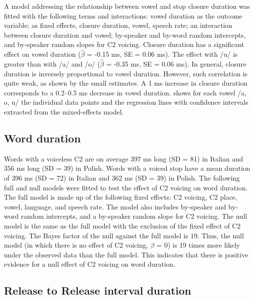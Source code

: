 \documentclass[12pt,]{article}
\begin{document}
A model addressing the relationship between vowel and stop closure
duration was fitted with the following terms and interactions: vowel
duration as the outcome variable; as fixed effects, closure duration,
vowel, speech rate; an interaction between closure duration and vowel;
by-speaker and by-word random intercepts, and by-speaker random slopes
for C2 voicing. Closure duration has a significant effect on vowel
duration (\(\hat{\beta}\) = -0.15 ms, SE = 0.06 ms). The effect with /u/
is greater than with /a/ and /o/ (\(\hat{\beta}\) = -0.35 ms, SE = 0.06
ms). In general, closure duration is inversely proportional to vowel
duration. However, such correlation is quite weak, as shown by the small
estimates. A 1 ms increase in closure duration corresponds to a 0.2--0.5
ms decrease in vowel duration.  shows for each vowel /a,
o, u/ the individual data points and the regression lines with
confidence intervals extracted from the mixed-effects model.

\hypertarget{word-duration}{%
\subsection{Word duration}\label{word-duration}}

Words with a voiceless C2 are on average 397 ms long (SD = 81) in
Italian and 356 ms long (SD = 39) in Polish. Words with a voiced stop
have a mean duration of 396 ms (SD = 72) in Italian and 362 ms (SD = 39)
in Polish. The following full and null models were fitted to test the
effect of C2 voicing on word duration. The full model is made up of the
following fixed effects: C2 voicing, C2 place, vowel, language, and
speech rate. The model also includes by-speaker and by-word random
intercepts, and a by-speaker random slope for C2 voicing. The null model
is the same as the full model with the exclusion of the fixed effect of
C2 voicing. The Bayes factor of the null against the full model is 19.
Thus, the null model (in which there is no effect of C2 voicing,
\(\beta\) = 0) is 19 times more likely under the observed data than the
full model. This indicates that there is positive evidence for a null
effect of C2 voicing on word duration.

\hypertarget{release-to-release-interval-duration}{%
\subsection{Release to Release interval
duration}\label{release-to-release-interval-duration}}
\end{document}
